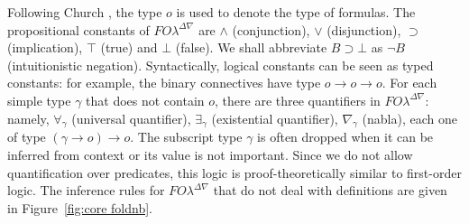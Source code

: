 \documentclass{acmtrans2m}
\newcommand{\FOL   }{FO\lambda}
\newcommand{\FOLDNb}{\FOL^{\Delta\nabla}}
\newcommand{\oimp}{\supset}
\newcommand{\ra}{\rightarrow}
\begin{document}
Following Church \citeyear{church40}, the type $o$ is used to denote the
type of formulas.  The propositional constants of $\FOLDNb$ are
$\land$ (conjunction), $\lor$ (disjunction), $\oimp$ (implication),
$\top$ (true) and $\bot$ (false). We shall abbreviate $B \oimp \bot$
as $\neg B$ (intuitionistic negation).
Syntactically, logical constants can be seen as typed constants: for example, the binary connectives have
type $o\ra o\ra o$.  For each simple type $\gamma$ that does not
contain $o$, there are three quantifiers in $\FOLDNb$: namely,
$\forall_\gamma$ (universal quantifier), $\exists_\gamma$ (existential
quantifier), $\nabla_\gamma$ (nabla), each one of type $(\gamma\ra
o)\ra o$.  The subscript type $\gamma$ is often dropped when it can be
inferred from context or its value is not important.  Since we do not
allow quantification over predicates, this logic is
proof-theoretically similar to first-order logic.
The inference rules for $\FOLDNb$ that do not deal with
definitions are given in Figure~\ref{fig:core foldnb}.  
\end{document}
